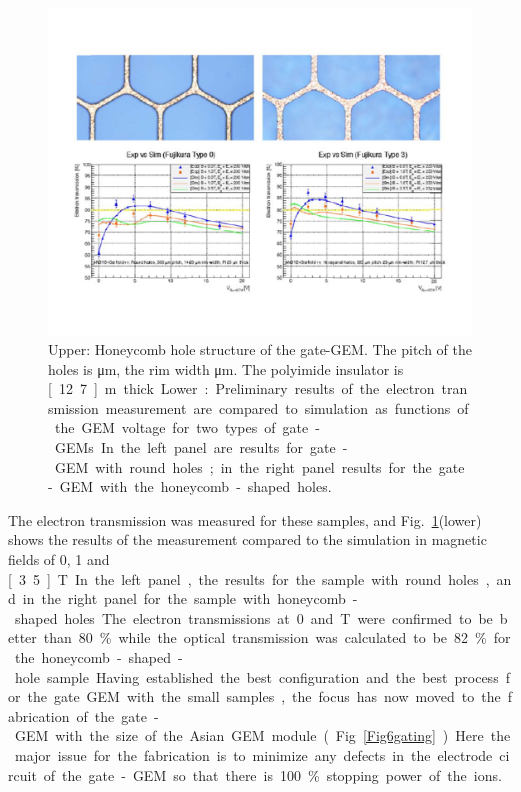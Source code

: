 \begin{figure}[htb!]
\begin{center}
\includegraphics[width=\columnwidth]{Tracker/TPC_Bonn/plots/TPC-Gate_Fig45gating.pdf}%
\caption{\label{Fig45gating} {Upper: Honeycomb hole structure of the gate-GEM.
The pitch of the holes is \unit[335]{\micro m}, the rim width \unit[29]{\micro m}.
The polyimide insulator is \unit[12.7]{\micro m} thick.
Lower: Preliminary results of the electron transmission measurement are compared to simulation
as functions of the GEM voltage for two types of gate-GEMs. In the left panel are
results for gate-GEM with round holes; in the right panel results for the gate-GEM with the honeycomb-shaped holes.}}
\end{center}
\end{figure}


The electron transmission was measured for these samples, and
Fig.~\ref{Fig45gating}(lower) shows the results of the measurement compared to the simulation in magnetic fields
of 0, 1 and \unit[3.5]{T}. In the left panel, the results for the sample with round holes, and in the right panel
for the sample with honeycomb-shaped holes.  The electron transmissions at 0 and \unit[1]{T} were confirmed
to be better than 80\% while the optical transmission was calculated to be 82\% for the honeycomb-shaped-hole sample.

Having established the best configuration and the best process for the gate GEM with the small samples,
the focus has now moved to the fabrication of the gate-GEM with  the size of the Asian GEM module (Fig.~\ref{Fig6gating}).
Here the major issue for the fabrication is to minimize any defects in the electrode circuit of the gate-GEM
so that there is 100\% stopping power of the ions.

